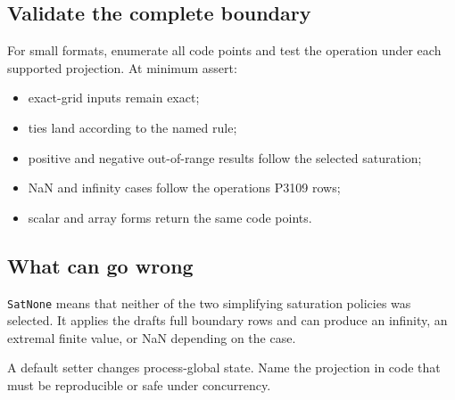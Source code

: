 \subsection{Validate the complete boundary}



\label{5649447960635150921}{}


For small formats, enumerate all code points and test the operation under each supported projection. At minimum assert:



\begin{itemize}
\item exact-grid inputs remain exact;


\item ties land according to the named rule;


\item positive and negative out-of-range results follow the selected saturation;


\item NaN and infinity cases follow the operation{\textquotesingle}s P3109 rows;


\item scalar and array forms return the same code points.

\end{itemize}


\subsection{What can go wrong}



\label{7385351218440078181-dup1}{}


\begin{tcolorbox}[toptitle=-1mm,bottomtitle=1mm,colback=admonition-warning!50!white,colframe=admonition-warning,title=\textbf{SatNone does not mean finite clamp}]
\texttt{SatNone} means that neither of the two simplifying saturation policies was selected. It applies the draft{\textquotesingle}s full boundary rows and can produce an infinity, an extremal finite value, or NaN depending on the case.

\end{tcolorbox}


\begin{tcolorbox}[toptitle=-1mm,bottomtitle=1mm,colback=admonition-warning!50!white,colframe=admonition-warning,title=\textbf{A default is state, not a declaration}]
A default setter changes process-global state. Name the projection in code that must be reproducible or safe under concurrency.

\end{tcolorbox}


